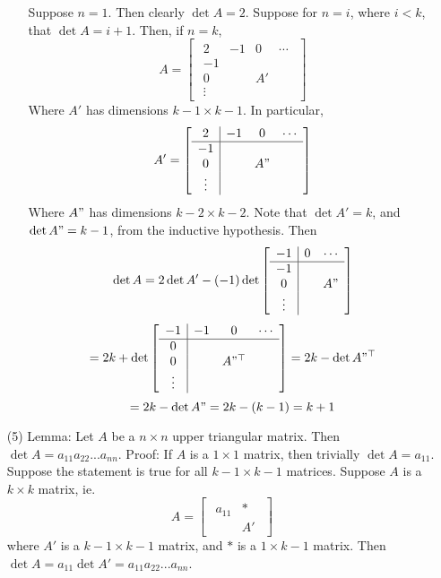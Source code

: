 \documentclass[12pt]{article}
\begin{document}
\begin{itemize}
\begin{itemize}
Suppose $n = 1$. Then clearly $\det A = 2$. Suppose for $n = i$, where $i < k$, that $\det A = i + 1$. Then, if $n = k$,
$$A = \begin{bmatrix}
\begin{array}{c|ccc}
2 & -1 & 0 & \cdots \\
\hline
-1 & \\
0 & & A' \\
\vdots &
\end{array}
\end{bmatrix}$$
Where $A'$ has dimensions $k - 1 \times k - 1$. In particular,
$$A' = \begin{bmatrix}
\begin{array}{c|ccc}
2 & -1 & 0 & \cdots \\
\hline
-1 & \\
0 & & A" \\
\vdots &
\end{array}
\end{bmatrix}$$
Where $A"$ has dimensions $k - 2 \times k - 2$. 
Note that $\det A' = k$, and $\det A" = k - 1$, from the inductive hypothesis. Then
$$\det A = 2\det A' - (-1)\det\begin{bmatrix}
\begin{array}{c|cc}
-1 & 0 & \cdots\\
\hline
-1 & \\
0 & & A" \\
\vdots &
\end{array}
\end{bmatrix}$$
$$= 2k + \det\begin{bmatrix}
\begin{array}{c|ccc}
-1 & -1 & 0 & \cdots \\
\hline
0 & \\
0 & & A"^\top \\
\vdots &
\end{array}
\end{bmatrix} = 2k - \det A"^\top$$
$$= 2k - \det A" = 2k - (k - 1) = k + 1$$
\end{itemize}
\item[(5)]
Lemma: Let $A$ be a $n \times n$ upper triangular matrix. Then $\det A = a_{11}a_{22}...a_{nn}$. Proof: If $A$ is a $1 \times 1$ matrix, then trivially $\det A = a_{11}$. Suppose the statement is true for all $k - 1 \times k - 1$ matrices. Suppose $A$ is a $k \times k$ matrix, ie.
$$A = \begin{bmatrix}
\begin{array}{c|c}
a_{11} & * \\
& A'
\end{array}
\end{bmatrix}$$
where $A'$ is a $k - 1 \times k - 1$ matrix, and $*$ is a $1 \times k - 1$ matrix. Then $\det A = a_{11}\det A' = a_{11}a_{22}...a_{nn}$.


\end{itemize}
\end{document}
